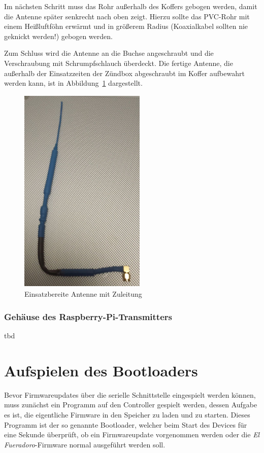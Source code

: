 \documentclass[paper=a4, parskip, numbers=noenddot, toc=listof, headsepline]{scrbook}
\newcommand{\anlage}{\emph{El Fueradoro}}
\begin{document}
						Im nächsten Schritt muss das Rohr außerhalb des Koffers gebogen werden, damit die Antenne später senkrecht nach oben zeigt. Hierzu sollte das PVC-Rohr mit einem Heißluftföhn erwärmt und in größerem Radius (Koaxialkabel sollten nie geknickt werden!) gebogen werden.

						Zum Schluss wird die Antenne an die Buchse angeschraubt und die Verschraubung mit Schrumpfschlauch überdeckt. Die fertige Antenne, die außerhalb der Einsatzzeiten der Zündbox abgeschraubt im Koffer aufbewahrt werden kann, ist in Abbildung~\ref{fig:antennefertig} dargestellt.

						\begin{figure}
							\centering
							\includegraphics[width=6cm, height=10cm]{Bilder/antennefertig}
							\caption{Einsatzbereite Antenne mit Zuleitung}
							\label{fig:antennefertig}
						\end{figure}

				\subsection{Gehäuse des Raspberry-Pi-Transmitters}

					tbd

		\chapter{Aufspielen des Bootloaders}
			\label{ch:bootloader}

			Bevor Firmwareupdates über die serielle Schnittstelle eingespielt werden können, muss zunächst ein Programm auf den Controller gespielt werden, dessen Aufgabe es ist, die eigentliche Firmware in den Speicher zu laden und zu starten. Dieses Programm ist der so genannte Bootloader, welcher beim Start des Devices für eine Sekunde überprüft, ob ein Firmwareupdate vorgenommen werden oder die {\anlage}-Firmware normal ausgeführt werden soll.
\end{document}
